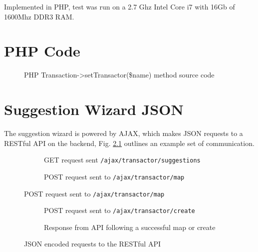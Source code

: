 \begin{appendices}
Implemented in PHP, test was run on a 2.7 Ghz Intel Core i7 with 16Gb of 1600Mhz DDR3 RAM.



\chapter{PHP Code} 

\begin{figure}

\label{fig:settransactor}
\caption{PHP Transaction->setTransactor(\$name) method source code}
\end{figure}

\chapter{Suggestion Wizard JSON}

The suggestion wizard is powered by AJAX, which makes JSON requests to a RESTful API on the backend, Fig. \ref{fig:json-examples} outlines an example set of communication.

\begin{figure}
    \begin{subfigure}[a]{\textwidth}
        
        \caption{GET request sent \lstinline{/ajax/transactor/suggestions}}
    \end{subfigure}
    
    \begin{subfigure}[b]{\textwidth}
        
        \caption{POST request sent to \lstinline{/ajax/transactor/map}}
    \end{subfigure}
\end{figure}

\begin{figure}
    \ContinuedFloat   
    \begin{subfigure}[c]{\textwidth}
        
        \caption{POST request sent to \lstinline{/ajax/transactor/create}}
    \end{subfigure}
    
    \begin{subfigure}[d]{\textwidth}
        
        \caption{Response from API following a successful map or create}
    \end{subfigure}    

    \caption{JSON encoded requests to the RESTful API}
    \label{fig:json-examples}
\end{figure}

\end{appendices}